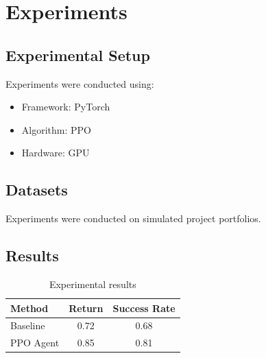 \section{Experiments}

\subsection{Experimental Setup}

Experiments were conducted using:

\begin{itemize}
\item Framework: PyTorch
\item Algorithm: PPO
\item Hardware: GPU
\end{itemize}

\subsection{Datasets}

Experiments were conducted on simulated project portfolios.

\subsection{Results}

\begin{table}[h]
\centering
\begin{tabular}{lcc}
\hline
Method & Return & Success Rate \\
\hline
Baseline & 0.72 & 0.68 \\
PPO Agent & 0.85 & 0.81 \\
\hline
\end{tabular}
\caption{Experimental results}
\end{table}
